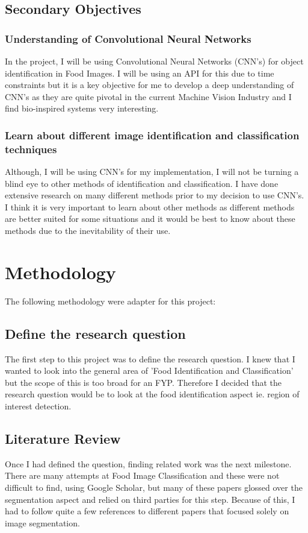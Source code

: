 \subsection{Secondary Objectives}
\subsubsection{Understanding of Convolutional Neural Networks}
In the project, I will be using Convolutional Neural Networks (CNN's) for object identification in Food Images.
I will be using an API for this due to time constraints but it is a key
objective for me to develop a deep understanding of CNN's as they are quite pivotal in the current Machine Vision Industry and I find bio-inspired systems very interesting.

\subsubsection{Learn about different image identification and classification techniques}
Although, I will be using CNN's for my implementation, I will not be turning a
blind eye to other methods of identification and classification.
I have done extensive research on many different methods prior to my decision to use CNN's.
I think it is very important to learn about other methods as different methods
are better suited for some situations and it would be best to know about these methods due to the inevitability of their use.

\section{Methodology}
The following methodology were adapter for this project:

\subsection{ Define the research question}
The first step to this project was to define the research question.
I knew that I wanted to look into the general area of 'Food Identification and
Classification' but the scope of this is too broad for an FYP.
Therefore I decided that the research question would be to look at the food identification aspect ie. region of interest detection.

\subsection{ Literature Review}
Once I had defined the question, finding related work was the next milestone.
There are many attempts at Food Image Classification and these were not difficult to find, using Google Scholar, but many of these papers glossed over the segmentation aspect and relied on third parties for this step.
Because of this, I had to follow quite a few references to different papers that focused solely on image segmentation.

